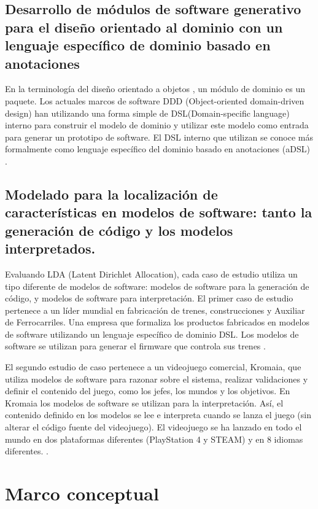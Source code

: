 \subsection{Desarrollo de módulos de software generativo para el diseño orientado al dominio con un lenguaje específico de dominio basado en anotaciones}
En la terminología del diseño orientado a objetos \cite{Feature}, un módulo de dominio es un paquete. Los actuales marcos de software DDD (Object-oriented domain-driven design) han utilizando una forma simple de DSL(Domain-specific language) interno para construir el modelo de dominio y utilizar este modelo como entrada para generar un prototipo de software. El DSL interno que utilizan se conoce más formalmente como lenguaje específico del dominio basado en anotaciones (aDSL) \cite{Generative}. 

\subsection{Modelado para la localización de características en modelos de software: tanto la generación de código y los modelos interpretados.}
Evaluando LDA (Latent Dirichlet Allocation), cada caso de estudio utiliza un tipo diferente de modelos de software: modelos de software para la generación de código, y modelos de software para interpretación. El primer caso de estudio pertenece a un líder mundial en fabricación de trenes, construcciones y Auxiliar de Ferrocarriles. Una empresa que formaliza los productos fabricados en modelos de software utilizando un lenguaje específico de dominio DSL. Los modelos de software se utilizan para generar el firmware que controla sus trenes \cite{Topic}. 

El segundo estudio de caso pertenece a un videojuego comercial, Kromaia, que utiliza modelos de software para razonar sobre el sistema, realizar validaciones y definir el contenido del juego, como los jefes, los mundos y los objetivos. En Kromaia los modelos de software se utilizan para la interpretación. Así, el contenido definido en los modelos se lee e interpreta cuando se lanza el juego (sin alterar el código fuente del videojuego). El videojuego se ha lanzado en todo el mundo en dos plataformas diferentes (PlayStation 4 y STEAM) y en 8 idiomas diferentes. \cite{Topic}.

\section{Marco conceptual}

